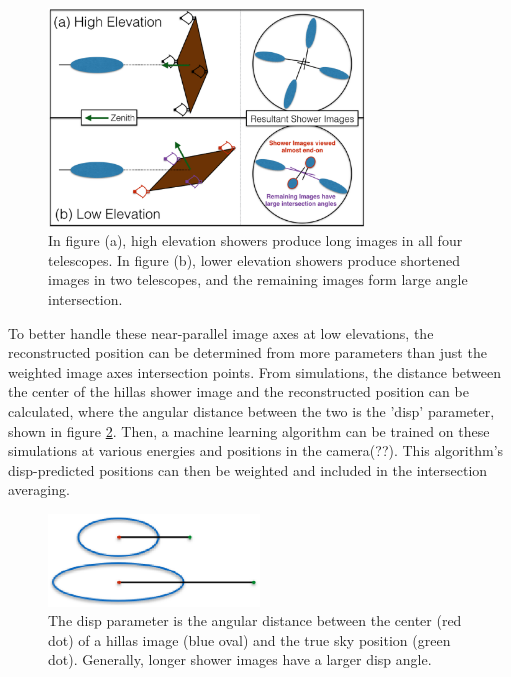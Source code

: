 \begin{figure}[ht]
  \begin{center}
    \includegraphics[width=0.75\textwidth]{images/high_elevation_vs_low_shower_images_cropped.eps}
    \caption[Shower Images at High and Low Elevations]{In figure (a), high elevation showers produce long images in all four telescopes.  In figure (b), lower elevation showers produce shortened images in two telescopes, and the remaining images form large angle intersection.}\label{fig:showerhighlowelev}
  \end{center}
\end{figure}


To better handle these near-parallel image axes at low elevations, the reconstructed position can be determined from more parameters than just the weighted image axes intersection points.
From simulations, the distance between the center of the hillas shower image and the reconstructed position can be calculated, where the angular distance between the two is the 'disp' parameter\cite{Senturk:2011}, shown in figure \ref{fig:dispdiagram}.
Then, a machine learning algorithm \cite{Beilicke2012NIM} can be trained on these simulations at various energies and positions in the camera(??).
This algorithm's disp-predicted positions can then be weighted and included in the intersection averaging.

\begin{figure}[ht]
  \begin{center}
    \includegraphics[width=0.5\textwidth]{images/disp_parameter_cropped.eps}
    \caption[Angular Reconstruction Disp]{The disp parameter is the angular distance between the center (red dot) of a hillas image (blue oval) and the true sky position (green dot).  Generally, longer shower images have a larger disp angle.}\label{fig:dispdiagram}
  \end{center}
\end{figure}

